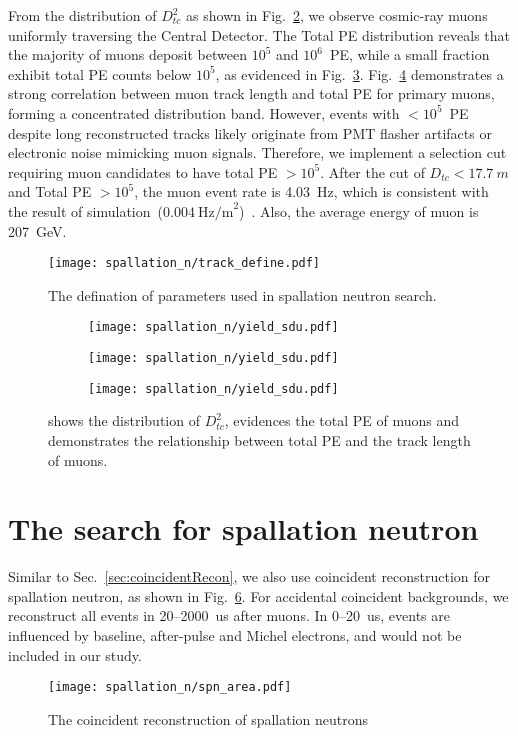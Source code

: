 From the distribution of $D_{tc}^2$ as shown in Fig.~\ref{fig:dfcc}, we observe cosmic-ray muons uniformly traversing the Central Detector. The Total PE distribution reveals that the majority of muons deposit between $10^5$ and $10^6$~\si{PE}, while a small fraction exhibit total PE counts below $10^5$, as evidenced in Fig.~\ref{fig:pe}. Fig.~\ref{fig:track-pe} demonstrates a strong correlation between muon track length and total PE for primary muons, forming a concentrated distribution band. However, events with $<10^5$~PE despite long reconstructed tracks likely originate from PMT flasher artifacts or electronic noise mimicking muon signals. Therefore, we implement a selection cut requiring muon candidates to have total PE $>10^5$. After the cut of $D_{tc}<\SI{17.7}{m}$ and Total PE $>10^5$, the muon event rate is \SI{4.03}{Hz}, which is consistent with the result of simulation~($0.004~\text{Hz/m}^2$)~\cite{muon207}. Also, the average energy of muon is \SI{207}{GeV}.
\begin{figure}[htbp]
	\centering
	\texttt{[image: spallation\_n/track\_define.pdf]}
	\caption{The defination of parameters used in spallation neutron search.}
	\label{fig:muonTrackDef}
\end{figure}


\begin{figure}[htbp]
	\centering
	\begin{subfigure}{0.5\textwidth}
		\centering
		\texttt{[image: spallation\_n/yield\_sdu.pdf]}
		\caption{}
		\label{fig:dfcc}
	\end{subfigure}%
	\begin{subfigure}{0.5\textwidth}
		\centering
		\texttt{[image: spallation\_n/yield\_sdu.pdf]}
		\caption{}
		\label{fig:pe}
	\end{subfigure}
	\begin{subfigure}{0.5\textwidth}
		\centering
		\texttt{[image: spallation\_n/yield\_sdu.pdf]}
		\caption{}
		\label{fig:track-pe}
	\end{subfigure}
	\caption{ shows the distribution of $D_{tc}^2$,  evidences the total PE of muons and  demonstrates the relationship between total PE and the track length of muons.}
	\label{fig:MuonInfo}
\end{figure}

\section{The search for spallation neutron}
Similar to Sec.~\ref{sec:coincidentRecon}, we also use coincident reconstruction for spallation neutron, as shown in Fig.~\ref{fig:coinRecSPN}. For accidental coincident backgrounds, we reconstruct all events in 20--\SI{2000}{us} after muons. In 0--\SI{20}{us}, events are influenced by baseline, after-pulse and Michel electrons, and would not be included in our study.
\begin{figure}[htbp]
	\centering
	\texttt{[image: spallation\_n/spn\_area.pdf]}
	\caption{The coincident reconstruction of spallation neutrons}
	\label{fig:coinRecSPN}
\end{figure}

